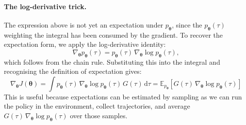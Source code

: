 \paragraph{The log-derivative trick.}
The expression above is not yet an expectation under $p_{\boldsymbol{\theta}}$,
since the $p_{\boldsymbol{\theta}}(\tau)$ weighting the integral has been
consumed by the gradient. To recover the expectation form, we apply the
log-derivative identity:
\begin{equation}
    \nabla_{\boldsymbol{\theta}} p_{\boldsymbol{\theta}}(\tau)
    = p_{\boldsymbol{\theta}}(\tau) \,
    \nabla_{\boldsymbol{\theta}} \log p_{\boldsymbol{\theta}}(\tau),
\end{equation}
which follows from the chain rule. Substituting this into the integral and
recognising the definition of expectation gives:
\begin{equation}
    \nabla_{\boldsymbol{\theta}} J(\boldsymbol{\theta})
    = \int p_{\boldsymbol{\theta}}(\tau) \,
    \nabla_{\boldsymbol{\theta}} \log p_{\boldsymbol{\theta}}(\tau) \,
    G(\tau) \, \mathrm{d}\tau
    = \mathbb{E}_{p_{\boldsymbol{\theta}}} \left[
        G(\tau) \, \nabla_{\boldsymbol{\theta}} \log p_{\boldsymbol{\theta}}(\tau)
    \right]
\end{equation}
This is useful because expectations can be estimated by sampling as we can run
the policy in the environment, collect trajectories, and average
$G(\tau) \, \nabla_{\boldsymbol{\theta}} \log p_{\boldsymbol{\theta}}(\tau)$
over those samples.

